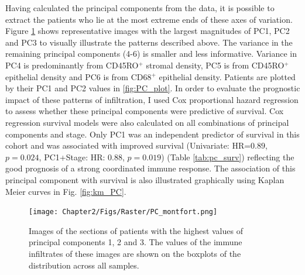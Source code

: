  
Having calculated the principal components from the data, it is possible to extract the patients who lie at the most extreme ends of these axes of variation. Figure \ref{fig:PC_examples} shows representative images with the largest magnitudes of PC1, PC2 and PC3 to visually illustrate the patterns described above. The variance in the remaining principal components (4-6) is smaller and less informative. Variance in PC4 is predominantly from CD45RO$^+$ stromal density, PC5 is from CD45RO$^+$ epithelial density and PC6 is from CD68$^+$ epithelial density. Patients are plotted by their PC1 and PC2 values in \ref{fig:PC_plot}. 
In order to evaluate the prognostic impact of these patterns of infiltration, I used Cox proportional hazard regression to assess whether these principal components were predictive of survival. Cox regression survival models were also calculated on all combinations of principal components and stage. Only PC1 was an independent predictor of survival in this cohort and was associated with improved survival (Univariate: HR=$0.89$, $p=0.024$, PC1+Stage: HR: $0.88$, $p=0.019$) (Table \ref{tab:pc_surv}) reflecting the good prognosis of a strong coordinated immune response. The association of this principal component with survival is also illustrated graphically using Kaplan Meier curves in Fig. \ref{fig:km_PC}.
\begin{landscape}
\begin{figure}[width=0.8\textwidth, keepaspectratio]
    \centering
    \texttt{[image: Chapter2/Figs/Raster/PC\_montfort.png]}
    \caption[Examples of tissue sections with largest values of principal components.]{Images of the sections of patients with the highest values of principal components 1, 2 and 3. The values of the immune infiltrates of these images are shown on the boxplots of the distribution across all samples.}
    \label{fig:PC_examples}
\end{figure}
\end{landscape}

